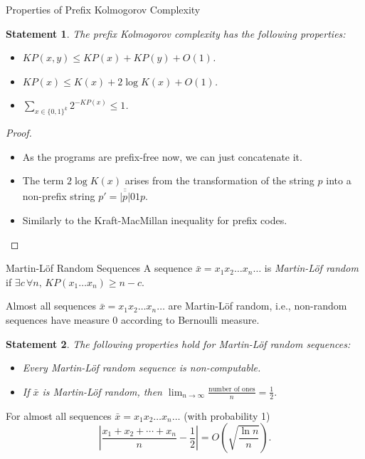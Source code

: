 \documentclass[aspectratio=169]{beamer}
\newtheorem{statement}{Statement}
\begin{document}
\begin{frame}{Properties of Prefix Kolmogorov Complexity}
\begin{statement}
    The prefix Kolmogorov complexity has the following properties:
    \begin{itemize}
        \item $KP(x,y) \le KP(x) + KP(y) + O(1)$.
        \item $KP(x) \le K(x) + 2\log K(x) + O(1)$.
        \item $\sum_{x \in \{0,1\}^k} 2^{-KP(x)} \le 1$.
    \end{itemize}
\end{statement}
\begin{proof}\mbox{}
    \begin{itemize}
        \item As the programs are prefix-free now, we can just concatenate it.
        \item The term $2\log K(x)$ arises from the transformation of the string $p$ into a non-prefix string $p' = \overline{\overline{|p|}}01p$.
        \item Similarly to the Kraft-MacMillan inequality for prefix codes.
    \end{itemize}
\end{proof}

\end{frame}

\begin{frame}{Martin-Löf Random Sequences}
    A sequence $\bar{x} = x_1 x_2 \dotso x_n \dotso$ is \emph{Martin-Löf random} if $\exists c \, \forall n, \, KP(x_1 \dotso x_n) \ge n - c$.
    \pause
    \begin{theorem}
        Almost all sequences $\bar{x} = x_1 x_2 \dotso x_n \dotso$ are Martin-Löf random, i.e., non-random sequences have measure 0 according to Bernoulli measure.
    \end{theorem}
    \pause
    \begin{statement}
        The following properties hold for Martin-Löf random sequences:
        \begin{itemize}
            \item Every Martin-Löf random sequence is non-computable.
            \item If $\bar{x}$ is Martin-Löf random, then
            $
            \lim_{n\to\infty} \frac{\text{number of ones}}{n} = \frac{1}{2}.
            $
        \end{itemize}
    \end{statement}
    \pause
    \begin{theorem}
        For almost all sequences $\bar{x} = x_1 x_2 \dotso x_n \dotso$ (with probability 1)
        \[
        \left|\frac{x_1 + x_2 + \dotsb + x_n}{n} - \frac{1}{2}\right| =
        O\left(\sqrt{\frac{\ln n}{n}}\right).
        \]
    \end{theorem}
\end{frame}
\end{document}
